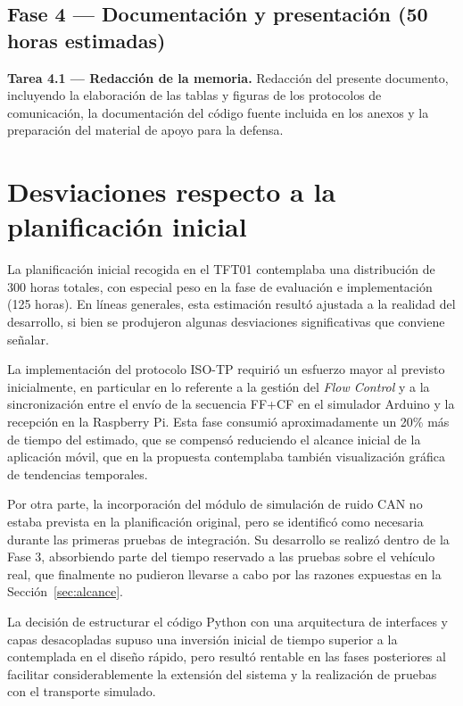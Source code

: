 \subsection{Fase 4 — Documentación y presentación \textnormal{(50 horas estimadas)}}

\textbf{Tarea 4.1 — Redacción de la memoria.} Redacción del presente documento, incluyendo la elaboración de las tablas y figuras de los protocolos de comunicación, la documentación del código fuente incluida en los anexos y la preparación del material de apoyo para la defensa.


\section{Desviaciones respecto a la planificación inicial}

La planificación inicial recogida en el TFT01 contemplaba una distribución de 300 horas totales, con especial peso en la fase de evaluación e implementación (125 horas). En líneas generales, esta estimación resultó ajustada a la realidad del desarrollo, si bien se produjeron algunas desviaciones significativas que conviene señalar.

La implementación del protocolo ISO-TP requirió un esfuerzo mayor al previsto inicialmente, en particular en lo referente a la gestión del \textit{Flow Control} y a la sincronización entre el envío de la secuencia FF+CF en el simulador Arduino y la recepción en la Raspberry Pi. Esta fase consumió aproximadamente un 20\% más de tiempo del estimado, que se compensó reduciendo el alcance inicial de la aplicación móvil, que en la propuesta contemplaba también visualización gráfica de tendencias temporales.

Por otra parte, la incorporación del módulo de simulación de ruido CAN no estaba prevista en la planificación original, pero se identificó como necesaria durante las primeras pruebas de integración. Su desarrollo se realizó dentro de la Fase 3, absorbiendo parte del tiempo reservado a las pruebas sobre el vehículo real, que finalmente no pudieron llevarse a cabo por las razones expuestas en la Sección~\ref{sec:alcance}.

La decisión de estructurar el código Python con una arquitectura de interfaces y capas desacopladas supuso una inversión inicial de tiempo superior a la contemplada en el diseño rápido, pero resultó rentable en las fases posteriores al facilitar considerablemente la extensión del sistema y la realización de pruebas con el transporte simulado.
